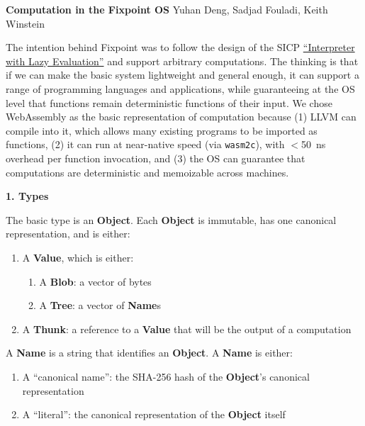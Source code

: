 \documentclass{article}
\newcommand{\blob}{\textbf{Blob}\xspace}
\newcommand{\valuex}{\textbf{Value}\xspace}
\newcommand{\object}{\textbf{Object}\xspace}
\newcommand{\thunk}{\textbf{Thunk}\xspace}
\newcommand{\name}{\textbf{Name}\xspace}
\newcommand{\names}{\textbf{Name}s\xspace}
\newcommand{\tree}{\textbf{Tree}\xspace}
\begin{document}
\textbf{Computation in the Fixpoint OS}\newline
Yuhan Deng, Sadjad Fouladi, Keith Winstein

The intention behind Fixpoint was to follow the design of the SICP
\href{https://mitpress.mit.edu/sites/default/files/sicp/full-text/book/book-Z-H-27.html#\%_sec_4.2.2}{``Interpreter
  with Lazy Evaluation''} and support arbitrary computations. The
thinking is that if we can make the basic system lightweight and
general enough, it can support a range of programming languages and
applications, while guaranteeing at the OS level that functions remain
deterministic functions of their input.  We chose WebAssembly as the
basic representation of computation because (1) LLVM can compile into
it, which allows many existing programs to be imported as functions,
(2) it can run at near-native speed (via \texttt{wasm2c}), with
$<$50~ns overhead per function invocation, and (3) the OS can
guarantee that computations are deterministic and memoizable across
machines.

\vspace{0.5\baselineskip}
{\Large \textbf{1. Types}}

The basic type is an \object. Each \object is immutable, has one canonical representation, and is either:
\begin{enumerate}[topsep=0pt]
\item A \valuex, which is either:
  \begin{enumerate}[topsep=0pt]
  \item A \blob: a vector of bytes

  \item A \tree: a vector of \names
  \end{enumerate}

\item A \thunk: a reference to a \valuex that will be the output of a computation
\end{enumerate}

A \name is a string that identifies an \object. A \name is either:
\begin{enumerate}[topsep=0pt]
\item A ``canonical name'': the SHA-256 hash of the \object's canonical representation

\item A ``literal'': the canonical representation of the \object itself
\end{enumerate}
\end{document}
